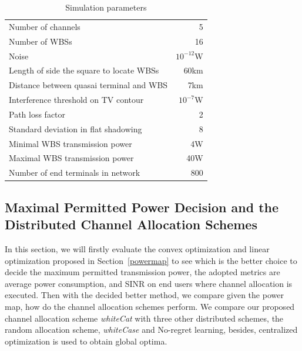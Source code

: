 \documentclass[times]{ettauth}
\theoremstyle{mytheoremstyle}
\theoremstyle{mytheoremstyle}
\theoremstyle{mytheoremstyle}
\begin{document}
\begin{table}[!h]
\centering
\begin{tabular}{|l|r|}
  \hline
  Number of channels 						& 5 \\
  Number of WBSs							& 16\\
  Noise 									& $10^{-12}$W \\ %
  Length of side the square to locate WBSs		& 60km\\
  Distance between quasai terminal and WBS 	& 7km \\
  Interference threshold on TV contour 		& $10^{-7}$W \\ %
  Path loss factor 							& 2 \\
  Standard deviation in flat shadowing		& 8\\
  Minimal WBS transmission power~\footnotemark{} 			& 4W \\
  Maximal WBS transmission power 			& 40W \\
  Number of end terminals in network 		& 800 \\
  \hline
\end{tabular}
\caption{Simulation parameters}
\label{simulationparameter}
\end{table}

\subsection{Maximal Permitted Power Decision and the Distributed Channel Allocation Schemes}
\label{MaxPower_whitecat}
In this section, we will firstly evaluate the convex optimization and linear optimization proposed in Section~\ref{powermap} to see which is the better choice to decide the maximum permitted transmission power, the adopted metrics are average power consumption, and SINR on end users where channel allocation is executed.
Then with the decided better method, we compare given the power map, how do the channel allocation schemes perform.
We compare our proposed channel allocation scheme \textit{whiteCat} with three other distributed schemes, the random allocation scheme, \textit{whiteCase} and No-regret learning, besides, centralized optimization is used to obtain global optima.
\end{document}
